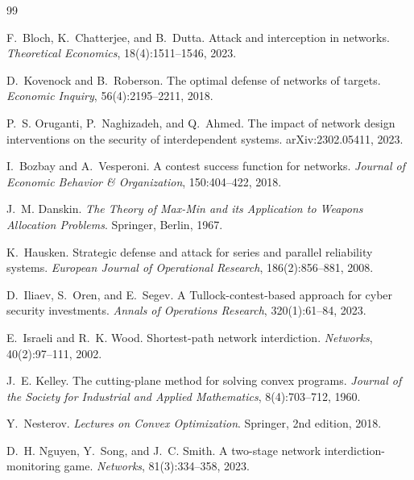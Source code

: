 \documentclass[11pt,a4paper]{article}
\theoremstyle{plain}
\theoremstyle{definition}
\begin{document}
\begin{thebibliography}{99}

F.~Bloch, K.~Chatterjee, and B.~Dutta.
\newblock Attack and interception in networks.
\newblock \emph{Theoretical Economics}, 18(4):1511--1546, 2023.

D.~Kovenock and B.~Roberson.
\newblock The optimal defense of networks of targets.
\newblock \emph{Economic Inquiry}, 56(4):2195--2211, 2018.

P.~S. Oruganti, P.~Naghizadeh, and Q.~Ahmed.
\newblock The impact of network design interventions on the security of
  interdependent systems.
\newblock arXiv:2302.05411, 2023.

I.~Bozbay and A.~Vesperoni.
\newblock A contest success function for networks.
\newblock \emph{Journal of Economic Behavior \& Organization}, 150:404--422, 2018.

J.~M. Danskin.
\newblock \emph{The Theory of Max-Min and its Application to Weapons Allocation Problems}.
\newblock Springer, Berlin, 1967.

K.~Hausken.
\newblock Strategic defense and attack for series and parallel reliability systems.
\newblock \emph{European Journal of Operational Research}, 186(2):856--881, 2008.

D.~Iliaev, S.~Oren, and E.~Segev.
\newblock A Tullock-contest-based approach for cyber security investments.
\newblock \emph{Annals of Operations Research}, 320(1):61--84, 2023.

E.~Israeli and R.~K. Wood.
\newblock Shortest-path network interdiction.
\newblock \emph{Networks}, 40(2):97--111, 2002.

J.~E. Kelley.
\newblock The cutting-plane method for solving convex programs.
\newblock \emph{Journal of the Society for Industrial and Applied Mathematics}, 8(4):703--712, 1960.

Y.~Nesterov.
\newblock \emph{Lectures on Convex Optimization}.
\newblock Springer, 2nd edition, 2018.

D.~H. Nguyen, Y.~Song, and J.~C. Smith.
\newblock A two-stage network interdiction-monitoring game.
\newblock \emph{Networks}, 81(3):334--358, 2023.


\end{thebibliography}
\end{document}
